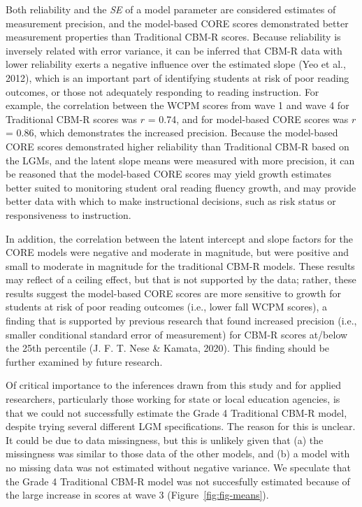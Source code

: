 \documentclass[
  english,
  man, fleqn, noextraspace]{apa6}
\begin{document}
Both reliability and the \emph{SE} of a model parameter are considered estimates of measurement precision, and the model-based CORE scores demonstrated better measurement properties than Traditional CBM-R scores. Because reliability is inversely related with error variance, it can be inferred that CBM-R data with lower reliability exerts a negative influence over the estimated slope (Yeo et al., 2012), which is an important part of identifying students at risk of poor reading outcomes, or those not adequately responding to reading instruction. For example, the correlation between the WCPM scores from wave 1 and wave 4 for Traditional CBM-R scores was \(r\) = 0.74, and for model-based CORE scores was \(r\) = 0.86, which demonstrates the increased precision. Because the model-based CORE scores demonstrated higher reliability than Traditional CBM-R based on the LGMs, and the latent slope means were measured with more precision, it can be reasoned that the model-based CORE scores may yield growth estimates better suited to monitoring student oral reading fluency growth, and may provide better data with which to make instructional decisions, such as risk status or responsiveness to instruction.

In addition, the correlation between the latent intercept and slope factors for the CORE models were negative and moderate in magnitude, but were positive and small to moderate in magnitude for the traditional CBM-R models. These results may reflect of a ceiling effect, but that is not supported by the data; rather, these results suggest the model-based CORE scores are more sensitive to growth for students at risk of poor reading outcomes (i.e., lower fall WCPM scores), a finding that is supported by previous research that found increased precision (i.e., smaller conditional standard error of measurement) for CBM-R scores at/below the 25th percentile (J. F. T. Nese \& Kamata, 2020). This finding should be further examined by future research.

Of critical importance to the inferences drawn from this study and for applied researchers, particularly those working for state or local education agencies, is that we could not successfully estimate the Grade 4 Traditional CBM-R model, despite trying several different LGM specifications. The reason for this is unclear. It could be due to data missingness, but this is unlikely given that (a) the missingness was similar to those data of the other models, and (b) a model with no missing data was not estimated without negative variance. We speculate that the Grade 4 Traditional CBM-R model was not succesfully estimated because of the large increase in scores at wave 3 (Figure~\ref{fig:fig-means}).
\end{document}
